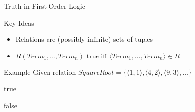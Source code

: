 \documentclass[14pt]{beamer}
\begin{document}
\begin{frame}{Truth in First Order Logic}
\begin{block}{Key Ideas}
\begin{itemize}
\item Relations are (possibly infinite) sets of tuples
\item $\textit{R}(\textit{Term}_1, \ldots, \textit{Term}_n)$ true iff $\langle\textit{Term}_1, \ldots, \textit{Term}_n\rangle \in \textit{R}$
\end{itemize}
\end{block}
\begin{block}{Example}
Given relation
$\textit{SquareRoot} = \{
\langle 1, 1 \rangle,
\langle 4, 2 \rangle,
\langle 9, 3 \rangle,
\ldots \}$
\begin{description}
\pause\item[$\textit{SquareRoot}(4, 2)$?] \pause true
\pause\item[$\textit{SquareRoot}(2, 2)$?] \pause false
\end{description}
\end{block}
\end{frame}
\end{document}
